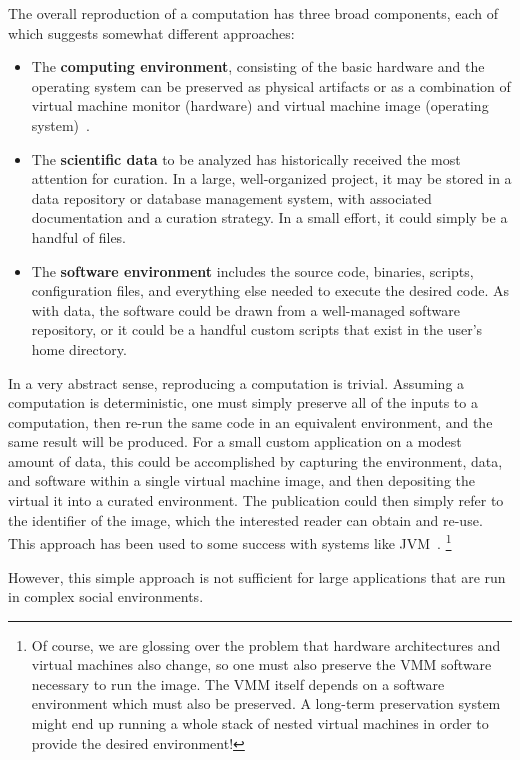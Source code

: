 \documentclass{sig-alternate}
\begin{document}
The overall reproduction of a computation has three broad components,
each of which suggests somewhat different approaches:

\begin{itemize}
\item The {\bf computing environment}, consisting of the basic hardware and the operating system can be preserved as physical artifacts or as a combination of virtual machine monitor (hardware) and virtual machine image (operating system)~\cite{matthews2009towards}.
\item The {\bf scientific data} to be analyzed has historically received the most attention for curation.  In a large, well-organized project, it may be stored in a  data repository or database management system, with associated documentation and a curation strategy.  In a small effort, it could simply be a handful of files.
\item The {\bf software environment} includes the source code, binaries, scripts, configuration files, and everything else needed to execute the desired code.  As with data, the software could be drawn from a well-managed software repository, or it could be a handful custom scripts that exist in the user's home directory.
\end{itemize}

In a very abstract sense, reproducing a computation is trivial.
Assuming a computation is deterministic, one must simply
preserve all of the inputs to a computation, then re-run
the same code in an equivalent environment, and the same result
will be produced.  For a small custom application on a modest
amount of data, this could be accomplished by capturing the environment,
data, and software within a single virtual machine image,
and then depositing the virtual
it into a curated environment.  The publication could
then simply refer to the identifier of the image, which the
interested reader can obtain and re-use. This approach has
been used to some success with systems like JVM~\cite{barthe2008preservation}.
\footnote{Of course, we are glossing over the problem that hardware
architectures and virtual machines also change, so one must also
preserve the VMM software necessary to run the image.  The VMM itself
depends on a software environment which must also be preserved.
A long-term preservation system might end up running a whole
stack of nested virtual machines in order to provide the desired
environment! }

However, this simple approach is not sufficient for large applications
that are run in complex social environments.
\end{document}
